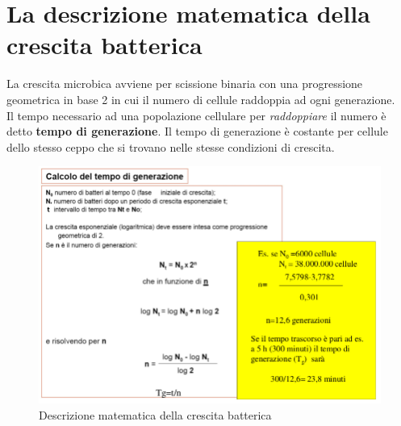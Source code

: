 \documentclass[11pt]{book}
\begin{document}
\begin{itemize}
\end{itemize}


\section{La descrizione matematica della crescita batterica}
La crescita microbica avviene per scissione binaria con una progressione geometrica in base 2 in cui il numero di cellule raddoppia ad ogni generazione.\\
Il tempo necessario ad una popolazione cellulare per \emph{raddoppiare} il numero è detto \textbf{tempo di generazione}. Il tempo di generazione è costante per cellule dello stesso ceppo che si trovano nelle stesse condizioni di crescita.


\begin{figure}[htp]
\centering
\includegraphics[scale=0.4]{img/Descrizione matematica crescita batterica.png}
\caption{Descrizione matematica della crescita batterica}
\label{}
\end{figure}
\end{document}
